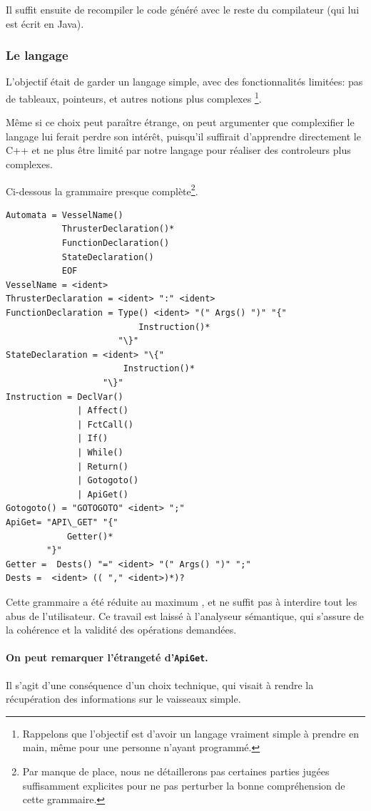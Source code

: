 \documentclass[a4paper,11pt]{article}
\begin{document}
        Il suffit ensuite de recompiler le code généré avec le reste du compilateur (qui lui est écrit en Java).

    \subsubsection{Le langage}
        L'objectif était de garder un langage simple, avec des fonctionnalités limitées: pas de tableaux, pointeurs, et autres notions plus \og complexes \fg{}\footnote{Rappelons que l'objectif est d'avoir un langage vraiment simple à prendre en main, même pour une personne n'ayant programmé.}.

        Même si ce choix peut paraître étrange, on peut argumenter que complexifier le langage lui ferait perdre son intérêt, puisqu'il suffirait d'apprendre directement le C++ et ne plus être limité par notre langage pour réaliser des controleurs plus complexes.
        
        Ci-dessous la grammaire presque complète\footnote{Par manque de place, nous ne détaillerons pas certaines parties jugées suffisamment explicites pour ne pas perturber la bonne compréhension de cette grammaire.}.

        \begin{Verbatim}[frame=single]
Automata = VesselName()
           ThrusterDeclaration()*
           FunctionDeclaration()
           StateDeclaration()
           EOF
VesselName = <ident>
ThrusterDeclaration = <ident> ":" <ident>
FunctionDeclaration = Type() <ident> "(" Args() ")" "{"
                          Instruction()*  
                      "\}"  
StateDeclaration = <ident> "\{"
                       Instruction()* 
                   "\}" 
Instruction = DeclVar()
              | Affect()
              | FctCall()
              | If() 
              | While() 
              | Return()
              | Gotogoto() 
              | ApiGet() 
Gotogoto() = "GOTOGOTO" <ident> ";"
ApiGet= "API\_GET" "{" 
            Getter()*
        "}"
Getter =  Dests() "=" <ident> "(" Args() ")" ";"
Dests =  <ident> (( "," <ident>)*)?
        \end{Verbatim}

        Cette grammaire a été réduite au maximum , et ne suffit pas à interdire tout les abus de l'utilisateur. Ce travail est laissé à l'analyseur sémantique, qui s'assure de la cohérence et la validité des opérations demandées.
        
        \paragraph{On peut remarquer l'étrangeté d'\texttt{ApiGet}.} Il s'agit d'une conséquence d'un choix technique, qui visait à rendre la récupération des informations sur le vaisseaux simple. 
        
\end{document}
